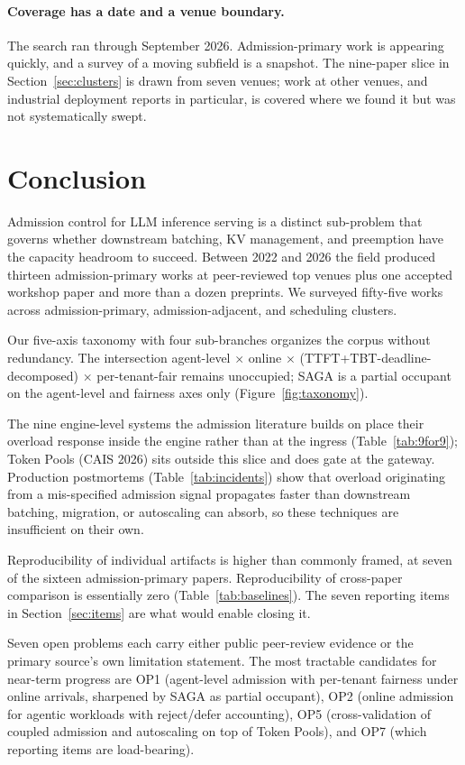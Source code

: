 \paragraph{Coverage has a date and a venue boundary.} The search ran
through September 2026. Admission-primary work is appearing quickly,
and a survey of a moving subfield is a snapshot. The nine-paper slice
in Section~\ref{sec:clusters} is drawn from seven venues; work at other
venues, and industrial deployment reports in particular, is covered
where we found it but was not systematically swept.

\section{Conclusion}
\label{sec:conc}

Admission control for LLM inference serving is a distinct sub-problem
that governs whether downstream batching, KV management, and
preemption have the capacity headroom to succeed. Between 2022 and
2026 the field produced thirteen admission-primary works at
peer-reviewed top venues plus one accepted workshop paper and more
than a dozen preprints. We surveyed fifty-five works across
admission-primary, admission-adjacent, and scheduling clusters.

Our five-axis taxonomy with four sub-branches organizes the corpus
without redundancy. The intersection agent-level $\times$ online
$\times$ (TTFT+TBT-deadline-decomposed) $\times$ per-tenant-fair
remains unoccupied; SAGA is a partial occupant on the agent-level
and fairness axes only (Figure~\ref{fig:taxonomy}).

The nine engine-level systems the admission literature builds on
place their overload response
inside the engine rather than at the ingress
(Table~\ref{tab:9for9}); Token Pools (CAIS 2026) sits outside this
slice and does gate at the gateway.
Production postmortems
(Table~\ref{tab:incidents}) show that overload originating from a
mis-specified admission signal propagates faster than downstream
batching, migration, or autoscaling can absorb, so these techniques
are insufficient on their own.

Reproducibility of individual artifacts is higher than commonly
framed, at seven of the sixteen admission-primary papers.
Reproducibility of cross-paper comparison is essentially zero
(Table~\ref{tab:baselines}). The seven reporting items in
Section~\ref{sec:items} are what would enable closing it.

Seven open problems each carry either public peer-review evidence or
the primary source's own limitation statement. The most tractable
candidates for near-term progress are OP1 (agent-level admission
with per-tenant fairness under online arrivals, sharpened by SAGA
as partial occupant), OP2 (online admission for agentic workloads
with reject/defer accounting), OP5 (cross-validation of coupled
admission and autoscaling on top of Token Pools), and OP7 (which
reporting items are load-bearing).

